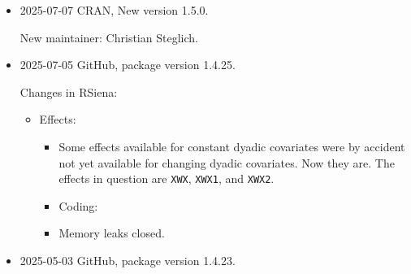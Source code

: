 \documentclass[a4paper,fleqn,11pt]{article}
\newcommand{\+}{\, + \,}
\newcommand{\sfn}[1]{\textsf{#1}}
\begin{document}
\begin{small}
\begin{itemize}
Changes in RSiena:
\begin{itemize}
\item Improvements of functionality:
   \begin{itemize}
   \item \sfn{sienaRI} reinstated.
  \item Option \texttt{prML=2} for maximum likelihood estimation
    using the \texttt{move} proposal step reinstated (\sfn{set\_algorithm\_saom}).
    \end{itemize}
\item Effects:
   \begin{itemize}
   \item New effects \texttt{divOut\_ego}, \texttt{divIn\_ego}.
    \end{itemize}
\end{itemize}

\item 2025-07-07 CRAN, New version 1.5.0.

New maintainer: Christian Steglich.

\item 2025-07-05 GitHub, package version 1.4.25.

Changes in RSiena:
\begin{itemize}
 \item Effects:
 \begin{itemize}
  \item Some effects available for constant dyadic covariates were by
    accident not yet available for changing dyadic covariates.
    Now they are. The effects in question are
    \texttt{XWX}, \texttt{XWX1}, and \texttt{XWX2}.
 \item Coding:
  \item Memory leaks closed.
 \end{itemize}
\end{itemize}

\item 2025-05-03 GitHub, package version 1.4.23.


\end{itemize}
\end{small}
\end{document}
